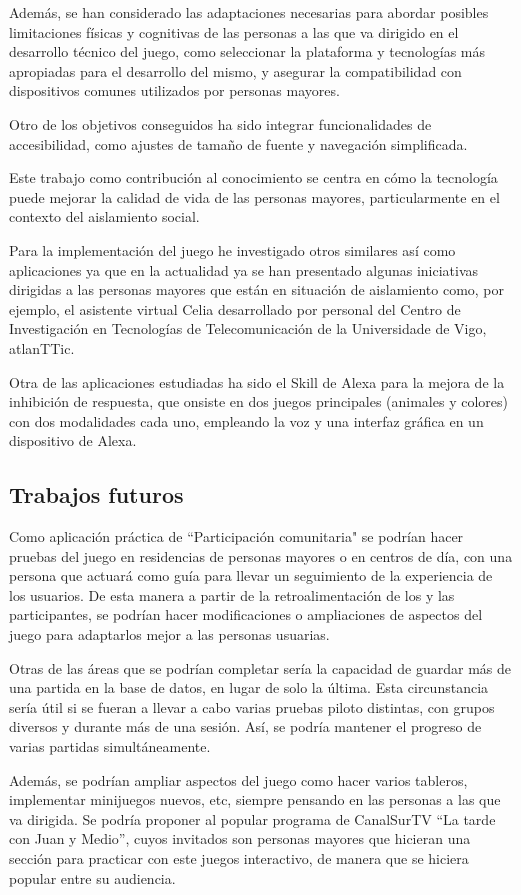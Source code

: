 Además, se han considerado las adaptaciones necesarias para abordar posibles limitaciones físicas y cognitivas de las personas a las que va dirigido en el desarrollo técnico del juego, como seleccionar la plataforma y tecnologías más apropiadas para el desarrollo del mismo, y asegurar la compatibilidad con dispositivos comunes utilizados por personas mayores.

Otro de los objetivos conseguidos ha sido integrar funcionalidades de accesibilidad, como ajustes de tamaño de fuente y navegación simplificada.

Este trabajo como contribución al conocimiento se centra en cómo la tecnología puede mejorar la calidad de vida de las personas mayores, particularmente en el contexto del aislamiento social.

Para la implementación del juego he investigado otros similares así como aplicaciones ya que en la actualidad ya se han presentado algunas iniciativas dirigidas a las personas mayores que están en situación de aislamiento como, por ejemplo, el asistente virtual Celia desarrollado por personal del Centro de Investigación en Tecnologías de Telecomunicación de la Universidade de Vigo, atlanTTic.

Otra de las aplicaciones estudiadas ha sido el Skill de Alexa para la mejora de la inhibición de respuesta, que onsiste en dos juegos principales (animales y colores) con dos modalidades cada uno, empleando la voz y una interfaz gráfica en un dispositivo de Alexa.

\subsection{Trabajos futuros}

Como aplicación práctica de “Participación comunitaria" se podrían hacer pruebas del juego en residencias de personas mayores o en centros de día, con una persona que actuará como guía para llevar un seguimiento de la experiencia de los usuarios.
De esta manera a partir de la retroalimentación de los y las participantes, se podrían hacer modificaciones o ampliaciones de aspectos del juego para adaptarlos mejor a las personas usuarias.

Otras de las áreas que se podrían completar sería la capacidad de guardar más de una partida en la base de datos, en lugar de solo la última. Esta circunstancia sería útil si se fueran a llevar a cabo varias pruebas piloto distintas, con grupos diversos y durante más de una sesión. Así, se podría mantener el progreso de varias partidas simultáneamente.

Además, se podrían ampliar aspectos del juego como hacer varios tableros, implementar minijuegos nuevos, etc, siempre pensando en las personas a las que va dirigida.
Se podría proponer al popular programa de CanalSurTV “La tarde con Juan y Medio”, cuyos invitados son personas mayores que hicieran una sección para practicar con este juegos interactivo, de manera que se hiciera popular entre su audiencia.
